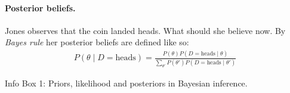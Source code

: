 \documentclass[nobib]{tufte-handout}
\begin{document}
\begin{InfoBox}[t]
{\begin{minipage}{1.0\textwidth}
    \paragraph{Posterior beliefs.} Jones observes that the coin landed heads. What should she
    believe now. By \emph{Bayes rule} her posterior beliefs are defined like so:
    \begin{align*}
      P(\theta \mid D = \text{heads}) = \frac{P(\theta) P(D = \text{heads} \mid \theta)}{\sum_{\theta'}P(\theta') P(D = \text{heads} \mid \theta')}
    \end{align*}
    




  \end{minipage} \par
  } \par
  \begin{center}
    Info Box 1: Priors, likelihood and posteriors in Bayesian inference.
  \end{center}
\end{InfoBox}






\printbibliography[heading=bibintoc]
\end{document}
